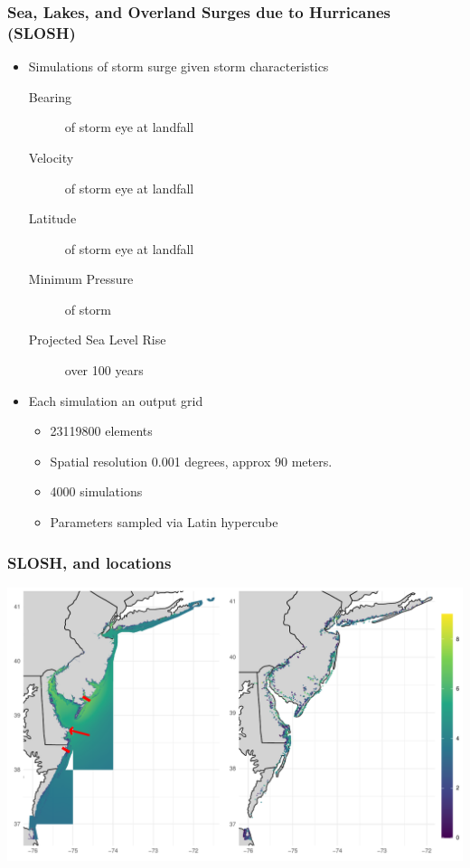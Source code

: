 \documentclass[aspectratio=169,10pt]{beamer}
\newlength{\frametextheight}
\begin{document}
\begin{frame}
    \frametitle{Sea, Lakes, and Overland Surges due to Hurricanes (SLOSH)}
    \begin{itemize}
        \item Simulations of storm surge given storm characteristics
        \begin{description}
            \item[Bearing] of storm eye at landfall
            \item[Velocity] of storm eye at landfall
            \item[Latitude] of storm eye at landfall
            \item[Minimum Pressure] of storm
            \item[Projected Sea Level Rise] over 100 years
        \end{description}
        \item Each simulation an output grid
        \begin{itemize}
            \item \num{23119800} elements
            \item Spatial resolution 0.001 degrees, approx 90 meters.
        \item 4000 simulations
        \item Parameters sampled via Latin hypercube
        \end{itemize}
    \end{itemize}
\end{frame} %

\begin{frame}
    \frametitle{SLOSH, and locations}
    \begin{center}
    \includegraphics[height=\frametextheight]{./ch3/plots/slosh_combined}
    \end{center}
\end{frame} %
\end{document}
